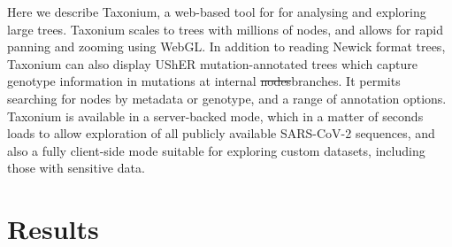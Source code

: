 \documentclass[twocolumn]{bioRxiv}
\providecommand{\DIFadd}[1]{{\protect\color{teal}#1}}
\providecommand{\DIFdel}[1]{{\protect\color{red}\sout{#1}}}
\providecommand{\DIFaddbegin}{}
\providecommand{\DIFaddend}{}
\providecommand{\DIFdelbegin}{}
\providecommand{\DIFdelend}{}
\begin{document}
Here we describe Taxonium, a web-based tool for for analysing and exploring large trees. Taxonium scales to trees with millions of nodes, and allows for rapid panning and zooming using WebGL. In addition to reading Newick format trees, Taxonium can also display UShER mutation-annotated trees which capture genotype information in mutations at internal \DIFdelbegin \DIFdel{nodes}\DIFdelend \DIFaddbegin \DIFadd{branches}\DIFaddend . It permits searching for nodes by metadata or genotype, and a range of annotation options. Taxonium is available in a server-backed mode, which in a matter of seconds loads to allow exploration of all publicly available SARS-CoV-2 sequences, and also a fully client-side mode suitable for exploring custom datasets, including those with sensitive data.


\section*{Results}\label{s:results}
\end{document}
